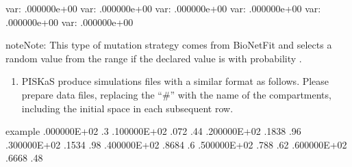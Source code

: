 \documentclass[letterpaper,10pt,english]{sphinxmanual}
\begin{document}
\begin{sphinxVerbatim}[commandchars=\\\{\}]
\PYGZpc{}var:  .000000e+00 
\PYGZpc{}var:  .000000e+00 
\PYGZpc{}var:  .000000e+00 
\PYGZpc{}var:  .000000e+00 
\PYGZpc{}var:  .000000e+00 
\PYGZpc{}var:  .000000e+00 
\end{sphinxVerbatim}

\begin{sphinxadmonition}{note}{Note:}
 This type of mutation strategy comes from BioNetFit and
selects a random value from the range 
if the declared value is  with probability .
\end{sphinxadmonition}
\begin{enumerate}
\def\theenumi{\arabic{enumi}}
\def\labelenumi{\theenumi .}
\makeatletter\def\p@enumii{\p@enumi \theenumi .}\makeatother
\setcounter{enumi}{1}
\item {} 

PISKaS produce simulations files with a similar format as follows. Please prepare
data files, replacing the “\#” with the name of the compartments, including the initial
space in each subsequent row.

\end{enumerate}

\begin{sphinxVerbatim}[commandchars=\\\{\}]
example   
 .000000E+02  .3
 .100000E+02 .072 .44
 .200000E+02 .1838 .96
 .300000E+02 .1534 .98
 .400000E+02 .8684 .6
 .500000E+02 .788 .62
 .600000E+02 .6668 .48
\end{sphinxVerbatim}
\end{document}
